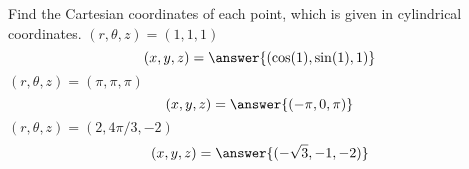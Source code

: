 \begin{problem}
Find the Cartesian coordinates of each point, which is given in cylindrical coordinates.
$(r,\theta,z) = (1,1,1)$
\[
(x,y,z) = \answer{(\cos(1), \sin(1), 1)}
\]
$(r,\theta,z) = (\pi,\pi,\pi)$
\[
(x,y,z) = \answer{(-\pi, 0, \pi)}
\]
$(r,\theta,z) = (2,4\pi/3,-2)$
\[
(x,y,z) = \answer{(-\sqrt{3}, -1, -2)}
\]
\end{problem}